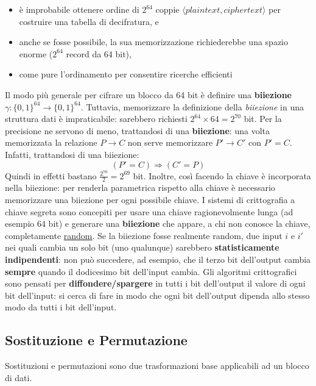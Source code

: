 \begin{itemize}
  \item è improbabile ottenere ordine di $2^{64}$ coppie $\langle plaintext, ciphertext \rangle$ per costruire una tabella di decifratura, e
  \item anche se fosse possibile, la sua memorizzazione richiederebbe una spazio enorme ($2^{64}$ record da 64 bit),
  \item come pure l’ordinamento per consentire ricerche efficienti
\end{itemize}

Il modo più generale per cifrare un blocco da 64 bit è definire una \textbf{biiezione} $\gamma :\{0,1\}^{64} \rightarrow \{0,1\}^{64}$. Tuttavia, memorizzare la definizione della \emph{biiezione} in una struttura dati è impraticabile: sarebbero richiesti $2^{64} \times 64 = 2^{70}$ bit. Per la precisione ne servono di meno, trattandosi di una \textbf{biiezione}: una volta memorizzata la relazione $ P \rightarrow C $ non serve memorizzare $ P' \rightarrow C' $ con $ P' = C $. Infatti, trattandosi di una biiezione:
\begin{equation}
(P' = C) \Rightarrow (C' = P)
\end{equation} 
Quindi in effetti bastano $\frac{2^{70}}{2} = 2^{69}$ bit. Inoltre, così facendo la chiave è incorporata nella biiezione: per renderla parametrica rispetto alla chiave è necessario memorizzare una biiezione per ogni possibile chiave.\newline \newline
I sistemi di crittografia a chiave segreta sono concepiti per usare una chiave ragionevolmente lunga (ad esempio 64 bit) e generare una \textbf{biiezione} che appare, a chi non conosce la chiave, completamente \underline{random}. Se la biiezione fosse realmente random, due input $i$ e $i'$ nei quali cambia un solo bit (uno qualunque) sarebbero \textbf{statisticamente indipendenti}: non può succedere, ad esempio, che il terzo bit dell'output cambia \textbf{sempre} quando il dodicesimo bit dell'input cambia. Gli algoritmi crittografici sono pensati per \textbf{diffondere/spargere} in tutti i bit dell'output il valore di ogni bit dell'input: si cerca di fare in modo che ogni bit dell'output dipenda allo stesso modo da tutti i bit dell'input.

\subsection{Sostituzione e Permutazione}
Sostituzioni e permutazioni sono due trasformazioni base applicabili ad un blocco di dati.\newline \newline

